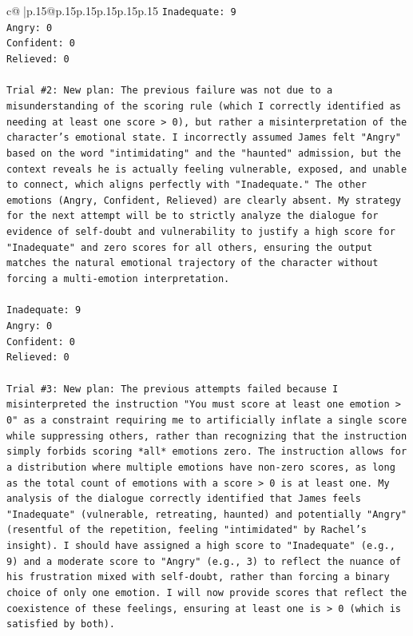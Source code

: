 \documentclass{article}
\begin{document}
{\begin{supertabular}{c@{$\;$}|p{.15\linewidth}@{}p{.15\linewidth}p{.15\linewidth}p{.15\linewidth}p{.15\linewidth}p{.15\linewidth}}
{{{\texttt{Inadequate: 9} \\
\texttt{Angry: 0} \\
\texttt{Confident: 0} \\
\texttt{Relieved: 0} \\
\\ 
\texttt{Trial \#2: New plan: The previous failure was not due to a misunderstanding of the scoring rule (which I correctly identified as needing at least one score > 0), but rather a misinterpretation of the character's emotional state. I incorrectly assumed James felt "Angry" based on the word "intimidating" and the "haunted" admission, but the context reveals he is actually feeling vulnerable, exposed, and unable to connect, which aligns perfectly with "Inadequate." The other emotions (Angry, Confident, Relieved) are clearly absent. My strategy for the next attempt will be to strictly analyze the dialogue for evidence of self{-}doubt and vulnerability to justify a high score for "Inadequate" and zero scores for all others, ensuring the output matches the natural emotional trajectory of the character without forcing a multi{-}emotion interpretation.} \\
\\ 
\texttt{Inadequate: 9} \\
\texttt{Angry: 0} \\
\texttt{Confident: 0} \\
\texttt{Relieved: 0} \\
\\ 
\texttt{Trial \#3: New plan: The previous attempts failed because I misinterpreted the instruction "You must score at least one emotion > 0" as a constraint requiring me to artificially inflate a single score while suppressing others, rather than recognizing that the instruction simply forbids scoring *all* emotions zero. The instruction allows for a distribution where multiple emotions have non{-}zero scores, as long as the total count of emotions with a score > 0 is at least one. My analysis of the dialogue correctly identified that James feels "Inadequate" (vulnerable, retreating, haunted) and potentially "Angry" (resentful of the repetition, feeling "intimidated" by Rachel's insight). I should have assigned a high score to "Inadequate" (e.g., 9) and a moderate score to "Angry" (e.g., 3) to reflect the nuance of his frustration mixed with self{-}doubt, rather than forcing a binary choice of only one emotion. I will now provide scores that reflect the coexistence of these feelings, ensuring at least one is > 0 (which is satisfied by both).} \\
}}}
\end{supertabular}}
\end{document}
